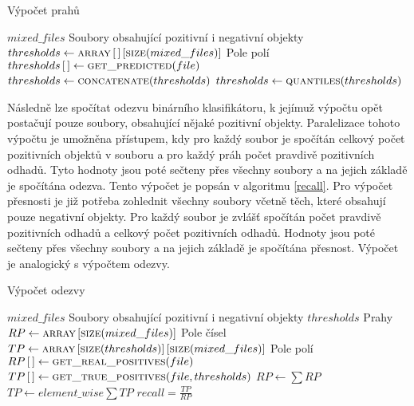 \begin{algorithm}
	\caption{Výpočet prahů}
	\label{thresholds}
	\begin{algorithmic}
		\Require $ mixed\_files $ \Comment Soubory obsahující pozitivní i negativní objekty
		\Statex
		\State $ thresholds \gets \Call{array}{} \left[ \, \right] \left[ \Call{size}{mixed\_files} \right] $ \Comment Pole polí
			\State $ thresholds \left[ \, \right] \gets \Call{get\_predicted}{file} $
		\EndFor
		\State $ thresholds \gets \Call{concatenate}{thresholds} $
		\State $ thresholds \gets \Call{quantiles}{thresholds} $
	\end{algorithmic}
\end{algorithm}

Následně lze spočítat odezvu binárního klasifikátoru, k jejímuž výpočtu opět postačují pouze soubory, obsahující nějaké pozitivní objekty. Paralelizace tohoto výpočtu je umožněna přístupem, kdy pro každý soubor je spočítán celkový počet pozitivních objektů v souboru a pro každý práh počet pravdivě pozitivních odhadů. Tyto hodnoty jsou poté sečteny přes všechny soubory a na jejich základě je spočítána odezva. Tento výpočet je popsán v algoritmu \ref{recall}. Pro výpočet přesnosti je již potřeba zohlednit všechny soubory včetně těch, které obsahují pouze negativní objekty. Pro každý soubor je zvlášť spočítán počet pravdivě pozitivních odhadů a celkový počet pozitivních odhadů. Hodnoty jsou poté sečteny přes všechny soubory a na jejich základě je spočítána přesnost. Výpočet je analogický s výpočtem odezvy. 

\begin{algorithm}
	\caption{Výpočet odezvy}
	\label{recall}
	\begin{algorithmic}
		\Require $ mixed\_files $ \Comment Soubory obsahující pozitivní i negativní objekty
		\Require $ thresholds $ \Comment Prahy
		\Statex
		\State $ RP \gets \Call{array}{} \left[ \Call{size}{mixed\_files} \right] $ \Comment Pole čísel
		\State $ TP \gets \Call{array}{} \left[ \Call{size}{thresholds} \right] \left[ \Call{size}{mixed\_files} \right] $ \Comment Pole polí
		\ParallelFor{$ file \in mixed\_files $}
			\State $ RP \left[ \, \right] \gets \Call{get\_real\_positives}{file} $
			\State $ TP \left[ \, \right] \gets \Call{get\_true\_positives}{file, thresholds} $
		\EndFor
		\State $ RP \gets \sum RP $
		\State $ TP \gets element\_wise \sum TP $
		\State $ recall = \frac{TP}{RP} $
	\end{algorithmic}
\end{algorithm}

